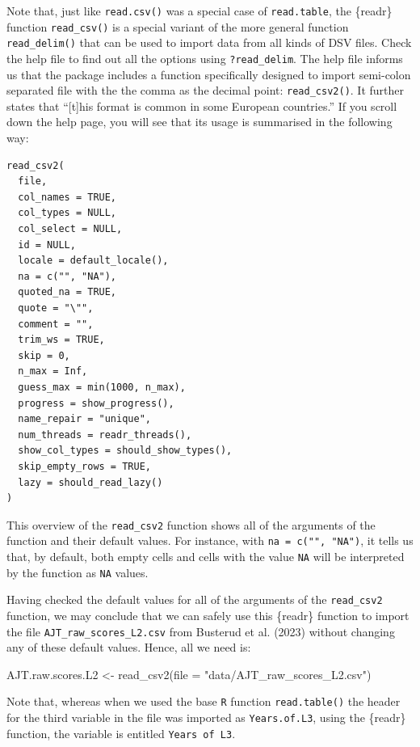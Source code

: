 \documentclass[
  letterpaper,
  DIV=11,
  numbers=noendperiod]{scrreprt}
\newenvironment{Shaded}{\begin{snugshade}}{\end{snugshade}}
\newcommand{\AttributeTok}[1]{\textcolor[rgb]{0.40,0.45,0.13}{#1}}
\newcommand{\FunctionTok}[1]{\textcolor[rgb]{0.28,0.35,0.67}{#1}}
\newcommand{\NormalTok}[1]{\textcolor[rgb]{0.00,0.23,0.31}{#1}}
\newcommand{\OtherTok}[1]{\textcolor[rgb]{0.00,0.23,0.31}{#1}}
\newcommand{\StringTok}[1]{\textcolor[rgb]{0.13,0.47,0.30}{#1}}
\begin{document}
Note that, just like \texttt{read.csv()} was a special case of
\texttt{read.table}, the \{readr\} function \texttt{read\_csv()} is a
special variant of the more general function \texttt{read\_delim()} that
can be used to import data from all kinds of DSV files. Check the help
file to find out all the options using \texttt{?read\_delim}. The help
file informs us that the package includes a function specifically
designed to import semi-colon separated file with the the comma as the
decimal point: \texttt{read\_csv2()}. It further states that
``{[}t{]}his format is common in some European countries.'' If you
scroll down the help page, you will see that its usage is summarised in
the following way:

\begin{verbatim}
read_csv2(
  file,
  col_names = TRUE,
  col_types = NULL,
  col_select = NULL,
  id = NULL,
  locale = default_locale(),
  na = c("", "NA"),
  quoted_na = TRUE,
  quote = "\"",
  comment = "",
  trim_ws = TRUE,
  skip = 0,
  n_max = Inf,
  guess_max = min(1000, n_max),
  progress = show_progress(),
  name_repair = "unique",
  num_threads = readr_threads(),
  show_col_types = should_show_types(),
  skip_empty_rows = TRUE,
  lazy = should_read_lazy()
)
\end{verbatim}

This overview of the \texttt{read\_csv2} function shows all of the
arguments of the function and their default values. For instance, with
\texttt{na\ =\ c("",\ "NA")}, it tells us that, by default, both empty
cells and cells with the value \texttt{NA} will be interpreted by the
function as \texttt{NA} values.

Having checked the default values for all of the arguments of the
\texttt{read\_csv2} function, we may conclude that we can safely use
this \{readr\} function to import the file
\texttt{AJT\_raw\_scores\_L2.csv} from Busterud et al. (2023) without
changing any of these default values. Hence, all we need is:

\begin{Shaded}
\begin{Highlighting}[]
\NormalTok{AJT.raw.scores.L2 }\OtherTok{\textless{}{-}} \FunctionTok{read\_csv2}\NormalTok{(}\AttributeTok{file =} \StringTok{"data/AJT\_raw\_scores\_L2.csv"}\NormalTok{)}
\end{Highlighting}
\end{Shaded}

Note that, whereas when we used the base \texttt{R} function
\texttt{read.table()} the header for the third variable in the file was
imported as \texttt{Years.of.L3}, using the \{readr\} function, the
variable is entitled \texttt{Years\ of\ L3}.
\end{document}
